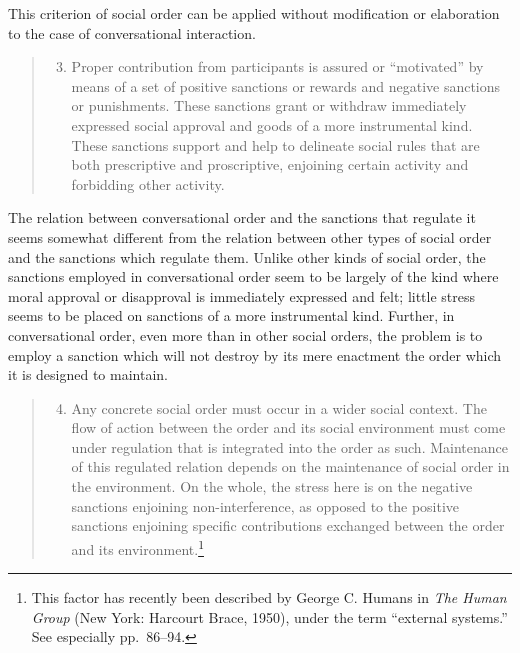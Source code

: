 \documentclass[openany,nobib]{tufte-book}
\begin{document}
\noindent This criterion of social order can be applied without modification or
elaboration to the case of conversational interaction.

\begin{quote}
\begin{enumerate}
\setcounter{enumi}{2}
\item
  Proper contribution from participants is assured or ``motivated'' by
  means of a set of positive sanctions or rewards and negative sanctions
  or punishments. These sanctions grant or withdraw immediately
  expressed social approval and goods of a more instrumental kind. These
  sanctions support and help to delineate social rules that are both
  prescriptive and proscriptive, enjoining certain activity and
  forbidding other activity.
\end{enumerate}
\end{quote}

\noindent The relation between conversational order and the sanctions that
regulate it seems somewhat different from the relation between other
types of social order and the sanctions which regulate them. Unlike
other kinds of social order, the sanctions employed in conversational
order seem to be largely of the kind where moral approval or disapproval
is immediately expressed and felt; little stress seems to be placed on
sanctions of a more instrumental kind. Further, in conversational order,
even more than in other social orders, the problem is to employ a
sanction which will not destroy by its mere enactment the order which it
is designed to maintain.

\begin{quote}
\begin{enumerate}
\setcounter{enumi}{3}
\item
  Any concrete social order must occur in a wider social context. The
  flow of action between the order and its social environment must come
  under regulation that is integrated into the order as such.
  Maintenance of this regulated relation depends on the maintenance of
  social order in the environment. On the whole, the stress here is on
  the negative sanctions enjoining non-interference, as opposed to the
  positive sanctions enjoining specific contributions exchanged between
  the order and its environment.\footnote{This factor has recently been
    described by George C. Humans in \emph{The Human Group} (New York:
    Harcourt Brace, 1950), under the term ``external systems.'' See
    especially pp.~86--94.}
\end{enumerate}
\end{quote}
\end{document}
